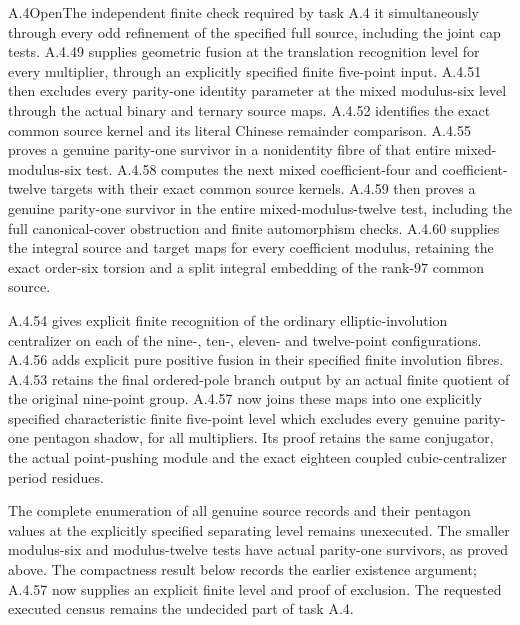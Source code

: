 \begin{result}{A.4}{Open}{The independent finite check required by task A.4}
it simultaneously through every odd refinement of the
specified full source, including the joint cap tests.
A.4.49 supplies geometric fusion at the translation
recognition level for every multiplier, through an explicitly
specified finite five-point input. A.4.51 then excludes every parity-one identity parameter
at the mixed modulus-six level through the actual binary
and ternary source maps. A.4.52 identifies the exact
common source kernel and its literal Chinese remainder
comparison. A.4.55 proves a genuine parity-one survivor
in a nonidentity fibre of that entire mixed-modulus-six test.
A.4.58 computes the next mixed coefficient-four and coefficient-twelve
targets with their exact common source kernels. A.4.59 then proves
a genuine parity-one survivor in the entire mixed-modulus-twelve
test, including the full canonical-cover obstruction and finite
automorphism checks.
A.4.60 supplies the integral source and target maps for every
coefficient modulus, retaining the exact order-six torsion and a
split integral embedding of the rank-$97$ common source.

 A.4.54 gives explicit finite recognition of
the ordinary elliptic-involution centralizer on each of
the nine-, ten-, eleven- and twelve-point configurations. A.4.56
adds explicit pure positive fusion in their specified finite involution
fibres. A.4.53 retains the final ordered-pole branch output by an
actual finite quotient of the original nine-point group. A.4.57 now
joins these maps into one explicitly specified characteristic finite
five-point level which excludes every genuine parity-one pentagon
shadow, for all multipliers. Its proof retains the same conjugator,
the actual point-pushing module and the exact eighteen coupled
cubic-centralizer period residues.


 The complete enumeration of all genuine source records and their
pentagon values at the explicitly specified separating level remains
unexecuted. The smaller modulus-six and modulus-twelve tests have
actual parity-one survivors, as proved above. The compactness result
below records the earlier existence argument; A.4.57 now supplies
an explicit finite level and proof of exclusion. The requested
executed census remains the undecided part of task A.4.
\end{result}

